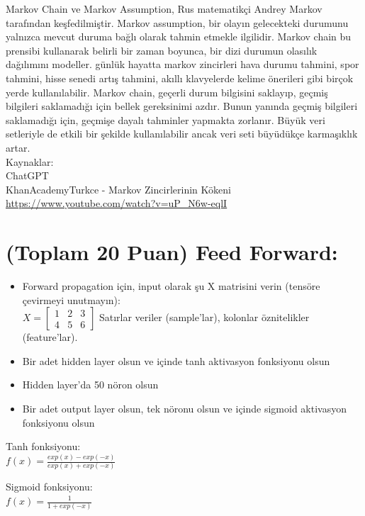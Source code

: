 \documentclass[11pt]{article}
\begin{document}
Markov Chain ve Markov Assumption, Rus matematikçi Andrey Markov tarafından keşfedilmiştir. Markov assumption, bir olayın gelecekteki durumunu yalnızca mevcut duruma bağlı olarak tahmin etmekle ilgilidir. Markov chain bu prensibi kullanarak belirli bir zaman boyunca, bir dizi durumun olasılık dağılımını modeller.  günlük hayatta markov zincirleri hava durumu tahmini, spor tahmini, hisse senedi artış tahmini, akıllı klavyelerde kelime önerileri gibi birçok yerde kullanılabilir. Markov chain, geçerli durum bilgisini saklayıp, geçmiş bilgileri saklamadığı için bellek gereksinimi azdır. Bunun yanında geçmiş bilgileri saklamadığı için, geçmişe dayalı tahminler yapmakta zorlanır. Büyük veri setleriyle de etkili bir şekilde kullanılabilir ancak veri seti büyüdükçe karmaşıklık artar.\\
Kaynaklar:\\
ChatGPT\\
KhanAcademyTurkce - Markov Zincirlerinin Kökeni \url{https://www.youtube.com/watch?v=uP_N6w-eqlI}

\section{(Toplam 20 Puan) Feed Forward:}
 
\begin{itemize}
    \item Forward propagation için, input olarak şu X matrisini verin (tensöre çevirmeyi unutmayın):\\
    $X = \begin{bmatrix}
        1 & 2 & 3\\
        4 & 5 & 6
        \end{bmatrix}$
    Satırlar veriler (sample'lar), kolonlar öznitelikler (feature'lar).
    \item Bir adet hidden layer olsun ve içinde tanh aktivasyon fonksiyonu olsun
    \item Hidden layer'da 50 nöron olsun
    \item Bir adet output layer olsun, tek nöronu olsun ve içinde sigmoid aktivasyon fonksiyonu olsun
\end{itemize}

Tanh fonksiyonu:\\
$f(x) = \frac{exp(x) - exp(-x)}{exp(x) + exp(-x)}$
\vspace{.2in}

Sigmoid fonksiyonu:\\
$f(x) = \frac{1}{1 + exp(-x)}$
\end{document}
